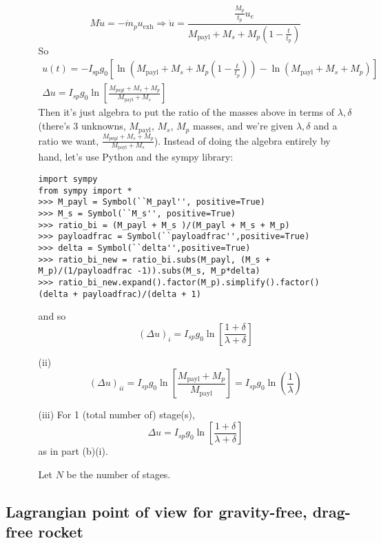 \documentclass[10pt]{amsart}
\begin{document}
\begin{multicols*}{2}
\begin{enumerate}
\begin{enumerate}
\[
M\dot{u} = -\dot{m}_p u_{\text{exh}} \Longrightarrow \dot{u} = \frac{ \frac{M_p}{t_p} u_e }{ M_{\text{payl}} + M_s + M_p(1- \frac{t}{t_p} ) } 
\]
So
\[
\begin{gathered}
  u(t) = -I_{\text{sp}} g_0 [ \ln{ (M_{\text{payl}}+M_s + M_p(1- \frac{t}{t_p} ) ) } - \ln{(M_{\text{payl}} + M_s + M_p ) } ] \\
  \Delta u = I_{sp} g_0 \ln{ \left[ \frac{M_{payl} + M_s + M_p }{ M_{\text{payl}} + M_s } \right] }
\end{gathered}
\]
Then it's just algebra to put the ratio of the masses above in terms of $\lambda, \delta$ (there's 3 unknowns, $M_{\text{payl}}$, $M_s$, $M_p$ masses, and we're given $\lambda, \delta$ and a ratio we want, $\frac{M_{payl} + M_s + M_p }{ M_{\text{payl}} + M_s }$).  Instead of doing the algebra entirely by hand, let's use Python and the sympy library:
\begin{lstlisting}
import sympy
from sympy import *
>>> M_payl = Symbol(``M_payl'', positive=True)
>>> M_s = Symbol(``M_s'', positive=True)
>>> ratio_bi = (M_payl + M_s )/(M_payl + M_s + M_p)
>>> payloadfrac = Symbol(``payloadfrac'',positive=True)
>>> delta = Symbol(``delta'',positive=True)
>>> ratio_bi_new = ratio_bi.subs(M_payl, (M_s + M_p)/(1/payloadfrac -1)).subs(M_s, M_p*delta)
>>> ratio_bi_new.expand().factor(M_p).simplify().factor()
(delta + payloadfrac)/(delta + 1)
\end{lstlisting}
and so 
\[
(\Delta u)_i = I_{sp} g_0 \ln{ \left[ \frac{ 1 + \delta }{ \lambda + \delta } \right] }
\]

\item[(ii)] \[
(\Delta u )_{ii} = I_{sp} g_0 \ln{ \left[ \frac{M_{\text{payl}} + M_p }{ M_{\text{payl}}} \right] } = I_{sp} g_0 \ln{ \left( \frac{1}{\lambda} \right) }
\]
\item[(iii)] For 1 (total number of) stage(s), 
\[
\Delta u = I_{sp} g_0 \ln{ \left[ \frac{ 1 + \delta }{ \lambda + \delta } \right] } 
\]
as in part (b)(i).  



Let $N$ be the number of stages.  
\end{enumerate}
\end{enumerate}




\subsection{Lagrangian point of view for gravity-free, drag-free rocket}


\end{multicols*}
\end{document}

